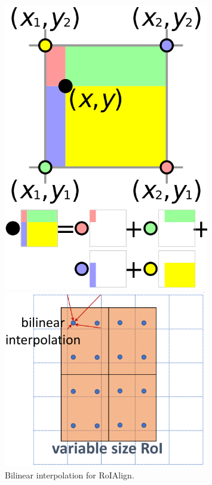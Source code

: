 \documentclass{article}
\begin{document}
\begin{figure}[htbp]
    \centering
    \begin{minipage}{0.4\textwidth}
        \centering
        \includegraphics[width=0.8\textwidth]{bilinear.png} %
    \end{minipage}\hfill
    \begin{minipage}{0.6\textwidth}
        \centering
        \includegraphics[width=0.8\textwidth]{roibilinear.PNG} %
        \caption{Bilinear interpolation for RoIAlign.}
    \end{minipage}
\end{figure}
\end{document}
